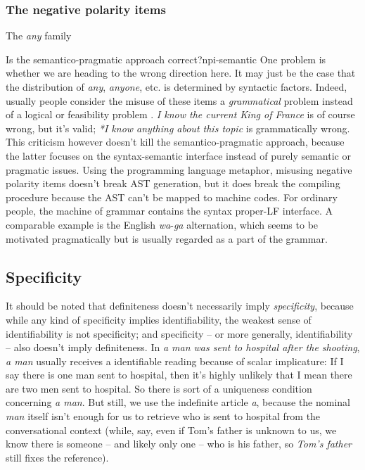 \documentclass[UTF8, a4paper, oneside, scheme=plain]{ctexrep}
\newcommand*{\citepage}[1]{p.~{#1}}
\newcommand{\corpus}[1]{\emph{#1}}
\begin{document}
\subsubsection{The negative polarity items}

The \corpus{any} family

\begin{theorybox}{Is the semantico-pragmatic approach correct?}{npi-semantic}
    One problem is whether we are heading to the wrong direction here.
    It may just be the case that the distribution of \corpus{any}, \corpus{anyone}, etc. 
    is determined by syntactic factors.
    Indeed, usually people consider the misuse of these items 
    a \emph{grammatical} problem 
    instead of a logical or feasibility problem
    \citep[\citepage{812}]{zeijlstra2013}.
    \corpus{I know the current King of France} is of course wrong,
    but it's valid;
    \corpus{*I know anything about this topic} is grammatically wrong.
    This criticism however doesn't kill the semantico-pragmatic approach,
    because the latter focuses on the syntax-semantic interface 
    instead of purely semantic or pragmatic issues.
    Using the programming language metaphor,
    misusing negative polarity items doesn't break AST generation,
    but it does break the compiling procedure
    because the AST can't be mapped to machine codes.
    For ordinary people, the machine of grammar contains the syntax proper-LF interface.
    A comparable example is the English \corpus{wa}-\corpus{ga} alternation,
    which seems to be motivated pragmatically 
    but is usually regarded as a part of the grammar.
\end{theorybox}

\subsection{Specificity}\label{sec:np.det.specific}

It should be noted that definiteness doesn't necessarily imply \emph{specificity},
because while any kind of specificity implies identifiability, 
the weakest sense of identifiability 
is not specificity;
and specificity -- or more generally, identifiability -- 
also doesn't imply definiteness.
In \corpus{a man was sent to hospital after the shooting}, 
\corpus{a man} usually receives a identifiable reading 
because of scalar implicature: 
If I say there is one man sent to hospital,
then it's highly unlikely that I mean there are two men sent to hospital.
So there is sort of a uniqueness condition concerning \corpus{a man}.
But still, we use the indefinite article \corpus{a},
because the nominal \corpus{man} itself 
isn't enough for us to retrieve who is sent to hospital from the conversational context
(while, say, even if Tom's father is unknown to us,
we know there is someone -- and likely only one -- who is his father,
so \corpus{Tom's father} still fixes the reference).
\end{document}
